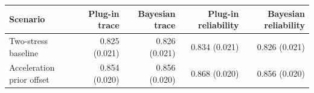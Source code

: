 \begin{tabular}{lrrrr}
\toprule
Scenario & Plug-in trace & Bayesian trace & Plug-in reliability & Bayesian reliability \\
\midrule
Two-stress baseline & 0.825 (0.021) & 0.826 (0.021) & 0.834 (0.021) & 0.826 (0.021) \\
Acceleration prior offset & 0.854 (0.020) & 0.856 (0.020) & 0.868 (0.020) & 0.856 (0.020) \\
\bottomrule
\end{tabular}
